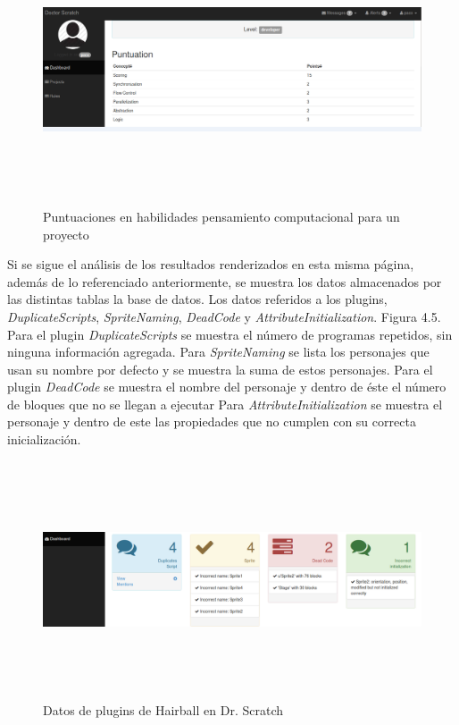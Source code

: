 \documentclass[a4paper, 12pt]{book}
\begin{document}
\begin{figure}[h]
  \centering
	\graphicspath{{img/}}
  \includegraphics[bb=0 0 800 600, width=18cm, height=8cm, keepaspectratio]{scoring.png}
	\caption{Puntuaciones en habilidades pensamiento computacional para un proyecto}
  \label{figura:foro_hilos}
\end{figure}


Si se sigue el análisis de los resultados renderizados en esta misma página, además de 
lo referenciado anteriormente, se muestra los datos almacenados por las distintas tablas
la base de datos.  Los datos referidos a los plugins, \emph{DuplicateScripts}, 
\emph{SpriteNaming}, \emph{DeadCode} y \emph{AttributeInitialization}. Figura 4.5. \\

Para el plugin \emph{DuplicateScripts} se muestra el número de programas repetidos, sin 
ninguna información agregada. Para \emph{SpriteNaming} se lista los personajes que usan
su nombre por defecto y se muestra la suma de estos personajes. 
Para el plugin \emph{DeadCode} se muestra el nombre del personaje y dentro de éste el 
número de bloques que no se llegan a ejecutar
Para \emph{AttributeInitialization} se muestra el personaje y dentro de este las 
propiedades que no cumplen con su correcta inicialización.

 \begin{figure}[h]
	  \centering
		\graphicspath{{img/}}
    \includegraphics[bb=0 0 800 600, width=18cm, height=7cm, keepaspectratio]{plugins.png}
		\caption{Datos de plugins de Hairball en Dr. Scratch}
    \label{figura:foro_hilos}
 \end{figure} 
\end{document}
